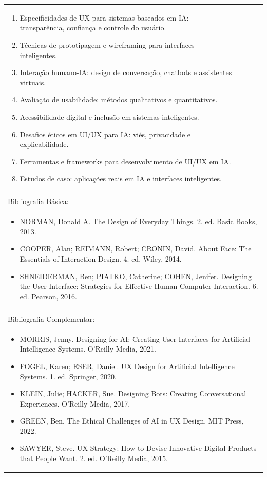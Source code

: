 \documentclass[11pt]{article}
\begin{document}
\begin{center}
\begin{longtable}{|p{4cm}|p{4cm}|p{4cm}|p{4cm}|}
{\begin{enumerate}
\item Especificidades de UX para sistemas baseados em IA: transparência, confiança e controle do usuário.
\item Técnicas de prototipagem e wireframing para interfaces inteligentes.
\item Interação humano-IA: design de conversação, chatbots e assistentes virtuais.
\item Avaliação de usabilidade: métodos qualitativos e quantitativos.
\item Acessibilidade digital e inclusão em sistemas inteligentes.
\item Desafios éticos em UI/UX para IA: viés, privacidade e explicabilidade.
\item Ferramentas e frameworks para desenvolvimento de UI/UX em IA.
\item Estudos de caso: aplicações reais em IA e interfaces inteligentes.\end{enumerate}}\\
\multicolumn{4}{|p{16cm}|}{}\\
\hline
\multicolumn{4}{|p{16cm}|}{Bibliografia Básica:}\\
\multicolumn{4}{|p{\dimexpr 16cm + 6\tabcolsep\relax}|}{%
\begin{itemize}\item NORMAN, Donald A. The Design of Everyday Things. 2. ed. Basic Books, 2013.
\item COOPER, Alan; REIMANN, Robert; CRONIN, David. About Face: The Essentials of Interaction Design. 4. ed. Wiley, 2014.
\item SHNEIDERMAN, Ben; PIATKO, Catherine; COHEN, Jenifer. Designing the User Interface: Strategies for Effective Human-Computer Interaction. 6. ed. Pearson, 2016.\end{itemize}}\\
\multicolumn{4}{|p{16cm}|}{}\\
\hline
\multicolumn{4}{|p{16cm}|}{Bibliografia Complementar:}\\
\multicolumn{4}{|p{\dimexpr 16cm + 6\tabcolsep\relax}|}{%
\begin{itemize}\item MORRIS, Jenny. Designing for AI: Creating User Interfaces for Artificial Intelligence Systems. O'Reilly Media, 2021.
\item FOGEL, Karen; ESER, Daniel. UX Design for Artificial Intelligence Systems. 1. ed. Springer, 2020.
\item KLEIN, Julie; HACKER, Sue. Designing Bots: Creating Conversational Experiences. O'Reilly Media, 2017.
\item GREEN, Ben. The Ethical Challenges of AI in UX Design. MIT Press, 2022.
\item SAWYER, Steve. UX Strategy: How to Devise Innovative Digital Products that People Want. 2. ed. O'Reilly Media, 2015.\end{itemize}}\\
\hline
\end{longtable}
\end{center}
\end{document}
